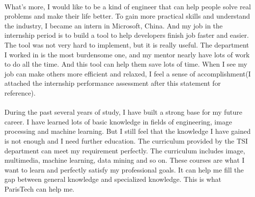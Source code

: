 \documentclass[a4paper]{article}
\begin{document}
\paragraph{}
What's more, I would like to be a kind of engineer that can help people solve real problems and make their life better. To gain more practical skills and understand the industry, I became an intern in Microsoft, China. And my job in the internship period is to build a tool to help developers finish job faster and easier. The tool was not very hard to implement, but it is really useful. The department I worked in is the most burdensome one, and my mentor nearly have lots of work to do all the time. And this tool can help them save lots of time. When I see my job can make others more efficient and relaxed, I feel a sense of accomplishment(I attached the internship performance assessment after this statement for reference).
\paragraph{}   
During the past several years of study, I have built a strong base for my future career. I have learned lots of basic knowledge in fields of engineering, image processing and machine learning. But I still feel that the knowledge I have gained is not enough and I need further education. The curriculum provided by the TSI department can meet my requirement perfectly. The curriculum includes image, multimedia, machine learning, data mining and so on. These courses are what I want to learn and perfectly satisfy my professional goals. It can help me fill the gap between general knowledge and specialized knowledge. This is what ParisTech can help me.
\end{document}
